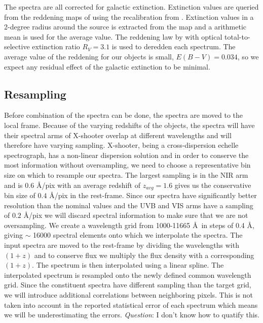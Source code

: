 \documentclass{aa}    %
\newcommand{\sectlabel}[1]{\label{sect:#1}}
\newcommand{\todo}[3]{{\color{#2}\emph{#1}: #3}}
\newcommand{\qtodo}[1]{\todo{Question}{red}{#1}}
\begin{document}
The spectra are all corrected for galactic extinction. Extinction values are queried from the reddening maps of \citet{Schlegel1998} using the recalibration from \citet{Schlafly2011}. Extinction values in a 2-degree radius around the source is extracted from the map and a arithmetic mean is used for the average value. The reddening law by \citet{Fitzpatrick1999} with optical total-to-selective extinction ratio $R_V = 3.1$ is used to deredden each spectrum. The average value of the reddening for our objects is small, $E(B-V) = 0.034$, so we expect any residual effect of the galactic extinction to be minimal. 





\subsection{Resampling} \sectlabel{rebin}

Before combination of the spectra can be done, the spectra are moved to the local frame. Because of the varying redshifts of the objects, the spectra will have their spectral arms of X-shooter overlap at different wavelengths and will therefore have varying sampling. X-shooter, being a cross-dispersion echelle spectrograph, has a non-linear dispersion solution and in order to conserve the most information without oversampling, we need to choose a representative bin size on which to resample our spectra. The largest sampling is in the NIR arm and is $0.6$ \AA/pix with an average redshift of $z_{avg} = 1.6$ gives us the conservative bin size of $0.4$ \AA/pix in the rest-frame. Since our spectra have significantly better resolution than the nominal values and the UVB and VIS arms have a sampling of $0.2$ \AA/pix we will discard spectral information to make sure that we are not oversampling. We create a wavelength grid from 1000-11665 \AA~in steps of 0.4 \AA, giving $\sim$ 16000 spectral elements onto which we interpolate the spectra. The input spectra are moved to the rest-frame by dividing the wavelengths with $(1 + z)$ and to conserve flux we multiply the flux density with a corresponding $(1 + z)$. The spectrum is then interpolated using a linear spline. The interpolated spectrum is resampled onto the newly defined common wavelength grid. Since the constituent spectra have different sampling than the target grid, we will introduce additional correlations between neighboring pixels. This is not taken into account in the reported statistical error of each spectrum which means we will be underestimating the errors. \qtodo{I don't know how to quatify this.}
\end{document}

